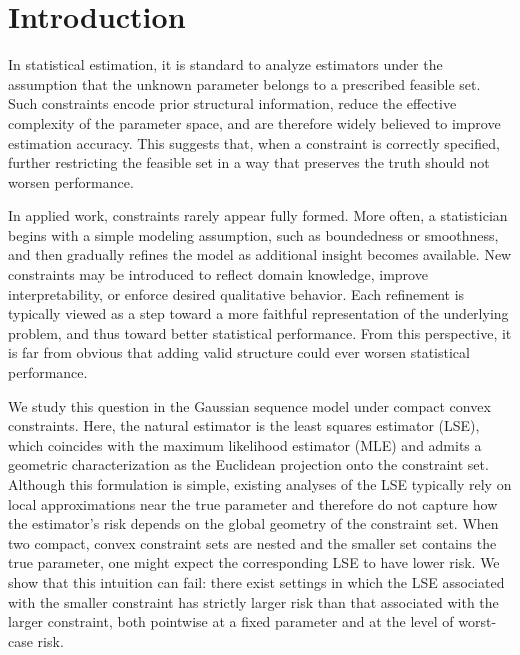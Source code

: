 \documentclass[11pt]{article}
\theoremstyle{plain}
\theoremstyle{definition}
\begin{document}
\section{Introduction}

In statistical estimation, it is standard to analyze estimators under the assumption that the unknown parameter belongs to a prescribed feasible set. Such constraints encode prior structural information, reduce the effective complexity of the parameter space, and are therefore widely believed to improve estimation accuracy. This suggests that, when a constraint is correctly specified, further restricting the feasible set in a way that preserves the truth should not worsen performance.

In applied work, constraints rarely appear fully formed. More often, a statistician begins with a simple modeling assumption, such as boundedness or smoothness, and then gradually refines the model as additional insight becomes available. New constraints may be introduced to reflect domain knowledge, improve interpretability, or enforce desired qualitative behavior. Each refinement is typically viewed as a step toward a more faithful representation of the underlying problem, and thus toward better statistical performance. From this perspective, it is far from obvious that adding valid structure could ever worsen statistical performance. 

We study this question in the Gaussian sequence model under compact convex constraints. Here, the natural estimator is the least squares estimator (LSE), which coincides with the maximum likelihood estimator (MLE) and admits a geometric characterization as the Euclidean projection onto the constraint set. Although this formulation is simple, existing analyses of the LSE typically rely on local approximations near the true parameter and therefore do not capture how the estimator's risk depends on the global geometry of the constraint set. When two compact, convex constraint sets are nested and the smaller set contains the true parameter, one might expect the corresponding LSE to have lower risk. We show that this intuition can fail: there exist settings in which the LSE associated with the smaller constraint has strictly larger risk than that associated with the larger constraint, both pointwise at a fixed parameter and at the level of worst-case risk.
\end{document}
